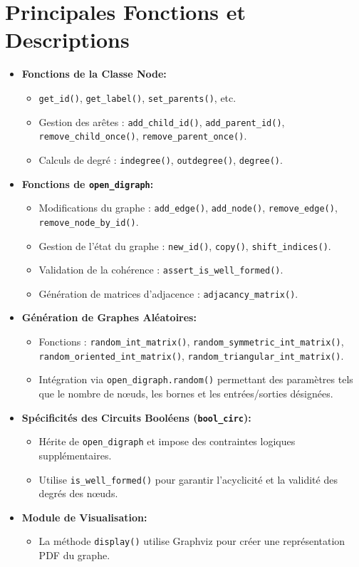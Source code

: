\documentclass{article}
\begin{document}
\section{Principales Fonctions et Descriptions}
\begin{itemize}
    \item \textbf{Fonctions de la Classe Node:}
    \begin{itemize}
        \item \texttt{get\_id()}, \texttt{get\_label()}, \texttt{set\_parents()}, etc.
        \item Gestion des arêtes : \texttt{add\_child\_id()}, \texttt{add\_parent\_id()}, \texttt{remove\_child\_once()}, \texttt{remove\_parent\_once()}.
        \item Calculs de degré : \texttt{indegree()}, \texttt{outdegree()}, \texttt{degree()}.
    \end{itemize}
    \item \textbf{Fonctions de \texttt{open\_digraph}:}
    \begin{itemize}
        \item Modifications du graphe : \texttt{add\_edge()}, \texttt{add\_node()}, \texttt{remove\_edge()}, \texttt{remove\_node\_by\_id()}.
        \item Gestion de l'état du graphe : \texttt{new\_id()}, \texttt{copy()}, \texttt{shift\_indices()}.
        \item Validation de la cohérence : \texttt{assert\_is\_well\_formed()}.
        \item Génération de matrices d'adjacence : \texttt{adjacancy\_matrix()}.
    \end{itemize}
    \item \textbf{Génération de Graphes Aléatoires:}
    \begin{itemize}
        \item Fonctions : \texttt{random\_int\_matrix()}, \texttt{random\_symmetric\_int\_matrix()}, \texttt{random\_oriented\_int\_matrix()}, \texttt{random\_triangular\_int\_matrix()}.
        \item Intégration via \texttt{open\_digraph.random()} permettant des paramètres tels que le nombre de nœuds, les bornes et les entrées/sorties désignées.
    \end{itemize}
    \item \textbf{Spécificités des Circuits Booléens (\texttt{bool\_circ}):}
    \begin{itemize}
        \item Hérite de \texttt{open\_digraph} et impose des contraintes logiques supplémentaires.
        \item Utilise \texttt{is\_well\_formed()} pour garantir l'acyclicité et la validité des degrés des nœuds.
    \end{itemize}
    \item \textbf{Module de Visualisation:}
    \begin{itemize}
        \item La méthode \texttt{display()} utilise Graphviz pour créer une représentation PDF du graphe.
    \end{itemize}
\end{itemize}
\end{document}
